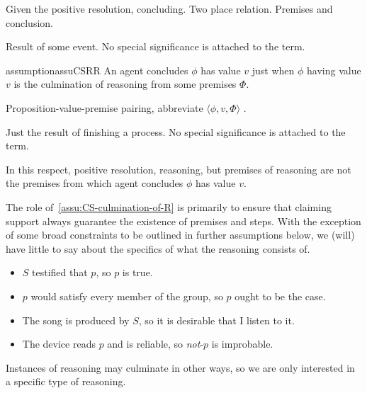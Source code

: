 \begin{note}
  Given the positive resolution, concluding.
  Two place relation.
  Premises and conclusion.

  Result of some event.
  No special significance is attached to the term.

  \begin{restatable}{assumption}{assuCSRR}
    \label{assu:CS-culmination-of-R}
    An agent concludes \(\phi\) has value \(v\) just when \(\phi\) having value \(v\) is the culmination of reasoning from some premises \(\Phi\).
  \end{restatable}

  \begin{notation}
    Proposition-value-premise pairing, abbreviate \(\langle \phi,v,\Phi \rangle\) .
  \end{notation}

  Just the result of finishing a process.
  No special significance is attached to the term.

  In this respect, positive resolution, reasoning, but premises of reasoning are not the premises from which agent concludes \(\phi\) has value \(v\).
\end{note}

\begin{note}
  The role of~\autoref{assu:CS-culmination-of-R} is primarily to ensure that claiming support always guarantee the existence of premises and steps.
  With the exception of some broad constraints to be outlined in further assumptions below, we (will) have little to say about the specifics of what the reasoning consists of.
\end{note}

\begin{note}
  \begin{itemize}
  \item \(S\) testified that \(p\), so \(p\) is true.
  \item \(p\) would satisfy every member of the group, so \(p\) ought to be the case.
  \item The song is produced by \(S\), so it is desirable that I listen to it.
  \item The device reads \(p\) and is reliable, so \emph{not}-\(p\) is improbable.
  \end{itemize}
\end{note}

\begin{note}
  Instances of reasoning may culminate in other ways, so we are only interested in a specific type of reasoning.
\end{note}

